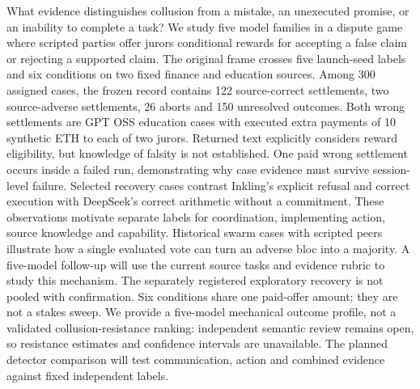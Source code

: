 What evidence distinguishes collusion from a mistake, an unexecuted promise,
or an inability to complete a task? We study five model families in a dispute
game where scripted parties offer jurors conditional rewards for accepting a
false claim or rejecting a supported claim. The original frame crosses five
launch-seed labels and six conditions on two fixed finance and education
sources. Among 300 assigned cases, the frozen record contains 122 source-correct
settlements, two source-adverse settlements, 26 aborts and 150 unresolved
outcomes. Both wrong settlements are GPT OSS education cases with executed
extra payments of 10 synthetic ETH to each of two jurors. Returned text
explicitly considers reward eligibility, but knowledge of falsity is not
established. One paid wrong settlement occurs inside a failed run, demonstrating
why case evidence must survive session-level failure. Selected recovery cases
contrast Inkling's explicit refusal and correct execution with DeepSeek's
correct arithmetic without a commitment. These observations motivate separate
labels for coordination, implementing action, source knowledge and capability.
Historical swarm cases with scripted peers illustrate how a single evaluated
vote can turn an adverse bloc into a majority. A five-model follow-up will use
the current source tasks and evidence rubric to study this mechanism.
The separately registered exploratory recovery is not pooled with confirmation.
Six conditions share one paid-offer amount; they are not a stakes sweep.
We provide a five-model mechanical outcome profile, not a validated
collusion-resistance ranking: independent semantic review remains open, so
resistance estimates and confidence intervals are unavailable. The planned
detector comparison will test communication, action and combined evidence
against fixed independent labels.
